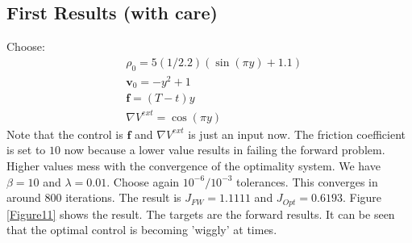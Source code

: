 \documentclass[11pt, a4paper]{article}
\theoremstyle{definition}
\newcommand{\Stav}{\mathbf{v}}
\newcommand{\Con}{\mathbf{f}}
\begin{document}
\subsection{First Results (with care)}
Choose:
\begin{align*}
&\rho_0 = 5(1/2.2)(\sin(\pi y) + 1.1)\\
&\Stav_0 = -y^2 + 1\\
&\Con = (T-t)y\\
&\nabla V^{ext} = \cos(\pi y)
\end{align*}
Note that the control is $\Con$ and $\nabla V^{ext}$ is just an input now.
The friction coefficient is set to $10$ now because a lower value results in failing the forward problem. Higher values mess with the convergence of the optimality system. We have $\beta = 10$ and $\lambda = 0.01$. Choose again $10^{-6}/10^{-3}$ tolerances.
This converges in around $800$ iterations. The result is $J_{FW} = 1.1111$ and $J_{Opt} = 0.6193$. Figure \ref{Figure11} shows the result. The targets are the forward results. It can be seen that the optimal control is becoming 'wiggly' at times.
\end{document}
